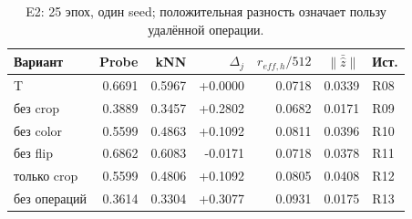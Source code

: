 \begin{table}[H]\centering\footnotesize
\setlength{\tabcolsep}{4pt}
\caption{E2: 25 эпох, один seed; положительная разность означает пользу удалённой операции.}\label{tab:e2}
\begin{tabular}{lrrrrrl}
\toprule
Вариант & Probe & kNN & $\Delta_j$ & $r_{eff,h}/512$ & $\|\bar{\hat z}\|$ & Ист. \\
\midrule
T & 0.6691 & 0.5967 & +0.0000 & 0.0718 & 0.0339 & R08 \\
без crop & 0.3889 & 0.3457 & +0.2802 & 0.0682 & 0.0171 & R09 \\
без color & 0.5599 & 0.4863 & +0.1092 & 0.0811 & 0.0396 & R10 \\
без flip & 0.6862 & 0.6083 & -0.0171 & 0.0718 & 0.0378 & R11 \\
только crop & 0.5599 & 0.4806 & +0.1092 & 0.0805 & 0.0408 & R12 \\
без операций & 0.3614 & 0.3304 & +0.3077 & 0.0931 & 0.0175 & R13 \\
\bottomrule
\end{tabular}
\end{table}
